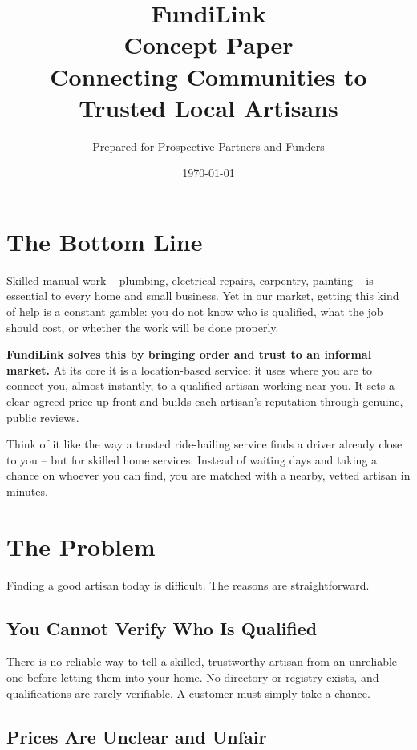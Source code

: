 \documentclass[11pt,a4paper]{article}
\title{\vspace{-1.5cm}\Huge\textbf{FundiLink}\\[0.5em]
\Large Concept Paper\\[0.3em]
\normalsize Connecting Communities to Trusted Local Artisans}
\author{Prepared for Prospective Partners and Funders}
\date{\today}
\begin{document}
\maketitle

\section{The Bottom Line}

Skilled manual work -- plumbing, electrical repairs, carpentry, painting -- is essential to
every home and small business. Yet in our market, getting this kind of help is a constant
gamble: you do not know who is qualified, what the job should cost, or whether the work will
be done properly.

\textbf{FundiLink solves this by bringing order and trust to an informal market.} At its core
it is a location-based service: it uses where you are to connect you, almost instantly, to a
qualified artisan working near you. It sets a clear agreed price up front and builds each
artisan's reputation through genuine, public reviews.

Think of it like the way a trusted ride-hailing service finds a driver already close to you --
but for skilled home services. Instead of waiting days and taking a chance on whoever you can
find, you are matched with a nearby, vetted artisan in minutes.

\section{The Problem}

Finding a good artisan today is difficult. The reasons are straightforward.

\subsection{You Cannot Verify Who Is Qualified}

There is no reliable way to tell a skilled, trustworthy artisan from an unreliable one before
letting them into your home. No directory or registry exists, and qualifications are rarely
verifiable. A customer must simply take a chance.

\subsection{Prices Are Unclear and Unfair}
\end{document}

